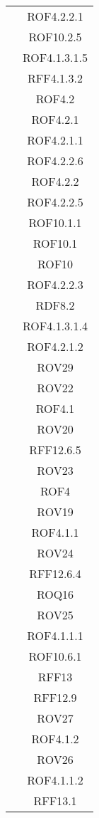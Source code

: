\begin{longtable}{|c|c|}
& ROF4.2.2.1\\
& ROF10.2.5\\
& ROF4.1.3.1.5\\
& RFF4.1.3.2\\
& ROF4.2\\
& ROF4.2.1\\
& ROF4.2.1.1\\
& ROF4.2.2.6\\
& ROF4.2.2\\
& ROF4.2.2.5\\
& ROF10.1.1\\
& ROF10.1\\
& ROF10\\
& ROF4.2.2.3\\
& RDF8.2\\
& ROF4.1.3.1.4\\
& ROF4.2.1.2\\
& ROV29\\
& ROV22\\
& ROF4.1\\
& ROV20\\
& RFF12.6.5\\
& ROV23\\
& ROF4\\
& ROV19\\
& ROF4.1.1\\
& ROV24\\
& RFF12.6.4\\
& ROQ16\\
& ROV25\\
& ROF4.1.1.1\\
& ROF10.6.1\\
& RFF13\\
& RFF12.9\\
& ROV27\\
& ROF4.1.2\\
& ROV26\\
& ROF4.1.1.2\\
& RFF13.1\\


\end{longtable}
